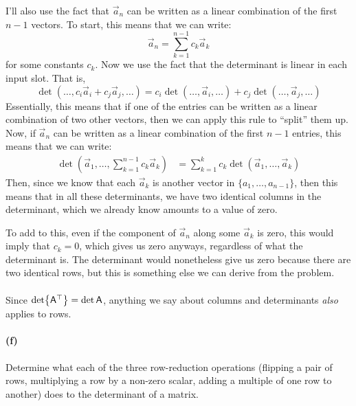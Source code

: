 \documentclass{article}
\begin{document}
\begin{solution}
	I'll also use the fact that $\vec a_n$ can be written as a linear combination of the first $n-1$ vectors. To
	start, this means that we can write: 
	\[
		\vec a_n = \sum_{k=1}^{n-1} c_k \vec a_k
	\] 
	for some constants $c_k$. Now we use the fact that the determinant is linear in each input slot. That is,
	\[
		\det(\dots, c_i\vec a_{i} + c_{j}\vec a_{j}, \dots) = c_i \det(\dots, \vec a_i, \dots) +
		c_{j}\det(\dots, \vec a_{
		j}, \dots)
	\] 
	Essentially, this means that if one of the entries can be written as a linear combination of two 
	other vectors, then we can apply this rule to ``split'' them up. Now, if $\vec a_n$ can be written 
	as a linear combination of the first $n-1$ entries, this means that we can write:
	\begin{align*}
		\det(\vec a_1, \dots, \sum_{k=1}^{n-1} c_k \vec a_k) &= \sum_{k = 1}^k c_k \det(\vec a_1, \dots, \vec a_k)
	\end{align*}
	Then, since we know that each $\vec a_k$ is another vector in $\{a_1, \dots, a_{n-1}\}$, then this means 
	that in all these determinants, we have two identical columns in the determinant, which we already know 
	amounts to a value of zero. 

	To add to this, even if the component of $\vec a_n$ along some $\vec a_k$ is zero, this would imply that 
	$c_k = 0$, which gives us zero anyways, regardless of what the determinant is. The determinant would
	nonetheless give us zero because there are two identical rows, but this is something else we can derive from
	the problem.
\end{solution}

\phline
\paragraph{}
Since $\det{\mathsf{A}^{\top}} = \det \mathsf{A}$, anything we say about columns and determinants \emph{also} applies to rows.  

\paragraph{(f)}
Determine what each of the three row-reduction operations (flipping a pair of rows, multiplying a row by a non-zero scalar, adding a multiple of one row to another)
does to the determinant of a matrix.
\end{document}
